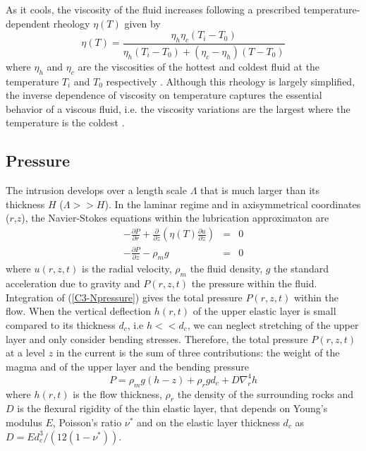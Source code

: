 As  it  cools,  the  viscosity  of the  fluid  increases  following  a
prescribed temperature-dependent rheology $\eta(T)$ given by
\begin{equation}
  \eta(T)=\frac{\eta_h
    \eta_c(T_i-T_0)}{\eta_h(T_i-T_0)+(\eta_c-\eta_h)(T-T_0)}
  \label{C3-rheology}
\end{equation}
where $\eta_h$  and $\eta_c$  are the viscosities  of the  hottest and
coldest  fluid  at  the   temperature  $T_i$  and  $T_0$  respectively
\citep{Bercovici:2007vc}.    Although   this   rheology   is   largely
simplified,  the  inverse  dependence   of  viscosity  on  temperature
captures  the  essential  behavior  of  a  viscous  fluid,  i.e.   the
viscosity  variations are  the largest  where the  temperature is  the
coldest
\citep{Anonymous:CZVBrBvv,Marsh:1981dc,Lejeune:1995fc,Giordano:2008em}.

\subsection{Pressure}
\label{C3-sec:Pressure}

The  intrusion develops  over a  length scale  $\Lambda$ that  is much
larger than its thickness $H$ ($\Lambda >> H$).  In the laminar regime
and  in   axisymmetrical  coordinates  ($r$,$z$),   the  Navier-Stokes
equations within the lubrication approximaton are
\begin{eqnarray}
  -\frac{\partial P}{\partial r}  +  \frac{\partial}{\partial z}\left(\eta(T) \frac{\partial u}{\partial z}\right) &=&0\label{C3-V1} \\
  -\frac{\partial P}{\partial z}  - \rho_{m}g&  =&0\label{C3-Npressure}
\end{eqnarray}
where $u(r,z,t)$ is  the radial velocity, $\rho_m$  the fluid density,
$g$  the  standard acceleration  due  to  gravity and  $P(r,z,t)$  the
pressure within the fluid.   Integration of (\ref{C3-Npressure}) gives
the  total pressure  $P(r,z,t)$ within  the flow.   When the  vertical
deflection $h(r,t)$  of the upper  elastic layer is small  compared to
its thickness  $d_c$, i.e $h<<d_c$,  we can neglect stretching  of the
upper layer and only consider  bending stresses.  Therefore, the total
pressure $P(r,z,t)$ at a level $z$ in  the current is the sum of three
contributions: the weight of the magma  and of the upper layer and the
bending pressure
\begin{equation}
  P = \rho_m g (h-z)+\rho_rgd_c+D\nabla_r^4h
\end{equation}
where  $h(r,t)$ is  the flow  thickness, $\rho_r$  the density  of the
surrounding rocks and $D$ is the flexural rigidity of the thin elastic
layer, that  depends on Young's  modulus $E$, Poisson's  ratio $\nu^*$
and     on     the     elastic    layer     thickness     $d_c$     as
$D = Ed_c^3/\left(12(1-\nu^*)\right)$.

